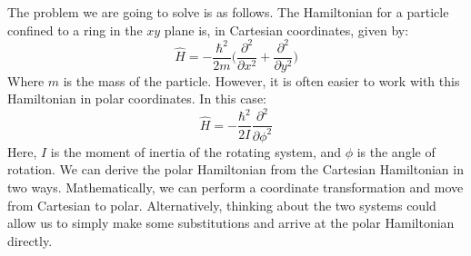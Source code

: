 \documentclass{memoir}[11pt,oneside,a4paper,openany]
\begin{document}
\begin{enumerate}
The problem we are going to solve is as follows. The Hamiltonian for a particle confined to a ring in the $xy$ plane is, in Cartesian coordinates, given by:
		\begin{equation}
			\hat{H} = -\frac{\hbar^2}{2m}\bigg(\frac{\partial^2}{\partial x^2} + \frac{\partial^2}{\partial y^2}\bigg)
		\end{equation}
Where $m$ is the mass of the particle. However, it is often easier to work with this Hamiltonian in polar coordinates. In this case:
		\begin{equation}
			\hat{H} = -\frac{\hbar^2}{2I}\frac{\partial^2}{\partial\phi^2}
		\end{equation}
Here, $I$ is the moment of inertia of the rotating system, and $\phi$ is the angle of rotation. We can derive the polar Hamiltonian from the Cartesian Hamiltonian in two ways. Mathematically, we can perform a coordinate transformation and move from Cartesian to polar. Alternatively, thinking about the two systems could allow us to simply make some substitutions and arrive at the polar Hamiltonian directly.


\end{enumerate}
\end{document}
